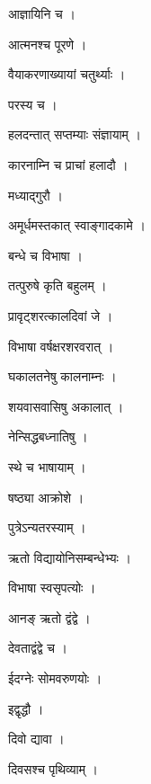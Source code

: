 \documentclass[10pt, openany]{book}
\begin{document}
\noindent आज्ञायिनि च ।

\noindent आत्मनश्च पूरणे ।

\noindent वैयाकरणाख्यायां चतुर्थ्याः ।

\noindent परस्य च ।

\noindent हलदन्तात् सप्तम्याः संज्ञायाम् ।

\noindent कारनाम्नि च प्राचां हलादौ ।

\noindent मध्याद्गुरौ ।

\noindent अमूर्धमस्तकात् स्वाङ्गादकामे ।

\noindent बन्धे च विभाषा ।

\noindent तत्पुरुषे कृति बहुलम् ।

\noindent प्रावृट्शरत्कालदिवां जे ।

\noindent विभाषा वर्षक्षरशरवरात् ।

\noindent घकालतनेषु कालनाम्नः ।

\noindent शयवासवासिषु अकालात् ।

\noindent नेन्सिद्धबध्नातिषु ।

\noindent स्थे च भाषायाम् ।

\noindent षष्ठ्या आक्रोशे ।

\noindent पुत्रेऽन्यतरस्याम् ।

\noindent ऋतो विद्यायोनिसम्बन्धेभ्यः ।

\noindent विभाषा स्वसृपत्योः ।

\noindent आनङ् ऋतो द्वंद्वे ।

\noindent देवताद्वंद्वे च ।

\noindent ईदग्नेः सोमवरुणयोः ।

\noindent इद्वृद्धौ ।

\noindent दिवो द्यावा ।

\noindent दिवसश्च पृथिव्याम् ।
\end{document}

